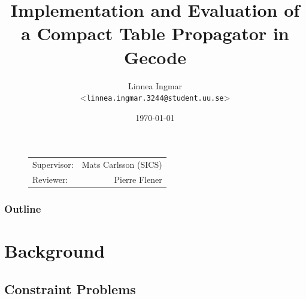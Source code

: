 \documentclass{beamer}
\title{Implementation and Evaluation of a Compact Table Propagator in Gecode}
\author[Linnea Ingmar | \emph{linnea.ingmar.3244@student.uu.se}] %
{Linnea Ingmar \\ <\texttt{linnea.ingmar.3244@student.uu.se}>}
\institute[Dept. of Information Technology] %
{
  The ASTRA Group\\ on Combinatorial Optimisation \\
  Uppsala University
}
\date[\today] %
{\today}
\begin{document}
\begin{frame}[plain] %
  \titlepage
  
  \begin{figure}
    \begin{flushright}
        \begin{tabular}[t,right]{lr}
          Supervisor: & Mats Carlsson (SICS) \\
          Reviewer:   & Pierre Flener
        \end{tabular}
      \end{flushright}
  \end{figure}

\end{frame}

\begin{frame}
    \frametitle{Outline}
    \tableofcontents[currentsection]
\end{frame}

\section{Background}

\subsection{Constraint Problems}
\end{document}
